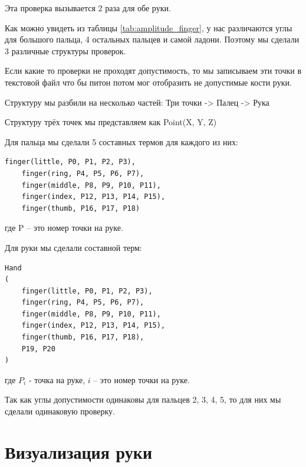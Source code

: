 \hspace{0.6cm}Эта проверка вызывается 2 раза для обе руки.

\hspace{0.6cm} Как можно увидеть из таблицы \ref{tab:amplitude_finger}, у нас различаются углы для большого пальца, 4 остальных пальцев и самой ладони. Поэтому мы сделали 3 различные структуры проверок.

\hspace{0.6cm} Если какие то проверки не проходят допустимость, то мы записываем эти точки в текстовой файл что бы питон потом мог отобразить не допустимые кости руки.

\hspace{0.6cm} Структуру мы разбили на несколько частей: Три точки -> Палец -> Рука

\hspace{0.6cm} Структуру трёх точек мы представляем как Point(X, Y, Z)

\hspace{0.6cm} Для пальца мы сделали 5 составных термов для каждого из них:
	
\begin{lstlisting}[caption=Листинг составных термов пальцев, label=struct:finger]
	finger(little, P0, P1, P2, P3),
	finger(ring, P4, P5, P6, P7),
	finger(middle, P8, P9, P10, P11),
	finger(index, P12, P13, P14, P15),
	finger(thumb, P16, P17, P18)
\end{lstlisting}
\hspace{0.6cm} где P – это номер точки на руке.

\hspace{0.6cm} Для руки мы сделали составной терм:
\begin{lstlisting}[caption=Листинг составного терма руки, label=struct:hand]
Hand
(
	finger(little, P0, P1, P2, P3),
	finger(ring, P4, P5, P6, P7),
	finger(middle, P8, P9, P10, P11),
	finger(index, P12, P13, P14, P15),
	finger(thumb, P16, P17, P18),
	P19, P20
)
\end{lstlisting}

\hspace{0.6cm} где $P_{i}$ - точка на руке, $i$ – это номер точки на руке.

\hspace{0.6cm} Так как углы допустимости одинаковы для пальцев 2, 3, 4, 5, то для них мы сделали одинаковую проверку.

\section{Визуализация руки}

